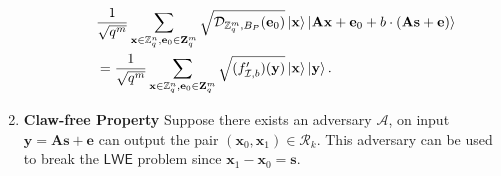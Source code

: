 \documentclass[cryptography,review,submit,pdftex,moreauthors,amsmath,amssymb,aps,strict]{Definitions/mdpi}
\begin{document}
\begin{Definition}
\begin{enumerate}
\begin{itemize}
\begin{align}
            &\frac{1}{\sqrt{q^m}}\sum_{\mathbf{x}\in\mathbb{Z}^n_q,\mathbf{e}_0\in\mathbf{Z}^m_q} \sqrt{\mathcal{D}_{\mathbb{Z}^m_q,B_P}(\mathbf{e}_0)}\ket{\mathbf{x}}\ket{\mathbf{A}\mathbf{x}+\mathbf{e}_0+b\cdot (\mathbf{A}\mathbf{s}+\mathbf{e})}\\
            &=\frac{1}{\sqrt{q^m}}\sum_{\mathbf{x}\in\mathbb{Z}^n_q,\mathbf{e}_0\in\mathbf{Z}^m_q} \sqrt{(f_{\mathcal{I},b}')(\mathbf{y})}\ket{\mathbf{x}}\ket{\mathbf{y}}.
            \label{eq:LWEtcfqstate}
        \end{align}
        
    \end{itemize}
     
    \item \textbf{Claw-free Property} Suppose there exists an adversary $\mathcal{A}$, on input $\mathbf{y}=\mathbf{A}\mathbf{s}+\mathbf{e}$ can output the pair $(\mathbf{x}_0,\mathbf{x}_1)\in\mathcal{R}_k$. This adversary can be used to break the $\mathsf{LWE}$ problem since $\mathbf{x}_1-\mathbf{x}_0=\mathbf{s}$.
    
\end{enumerate}
\end{Definition}
\end{document}
